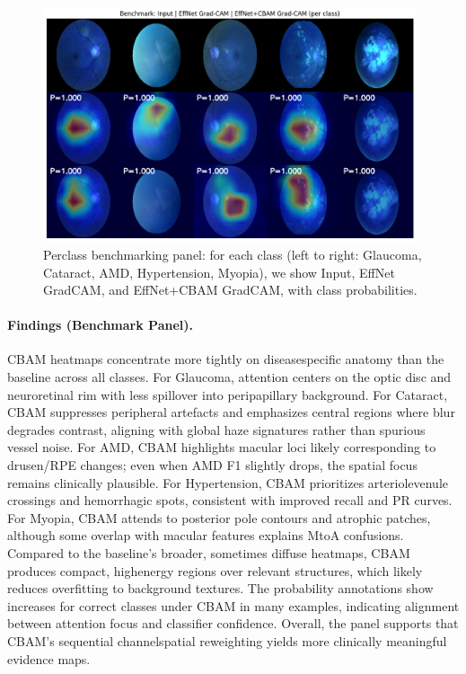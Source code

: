 \begin{figure}[H]
  \centering
  \includegraphics[width=0.98\textwidth]{../new_work/figures/gradcam_benchmark_panel.png}
  \caption{Per\textendash class benchmarking panel: for each class (left to right: Glaucoma, Cataract, AMD, Hypertension, Myopia), we show Input, EffNet Grad\textendash CAM, and EffNet+CBAM Grad\textendash CAM, with class probabilities.}
  \label{fig:gradcam_panel}
\end{figure}

\paragraph{Findings (Benchmark Panel).}
CBAM heatmaps concentrate more tightly on disease\textendash specific anatomy than the baseline across all classes. For Glaucoma, attention centers on the optic disc and neuroretinal rim with less spillover into peripapillary background. For Cataract, CBAM suppresses peripheral artefacts and emphasizes central regions where blur degrades contrast, aligning with global haze signatures rather than spurious vessel noise. For AMD, CBAM highlights macular loci likely corresponding to drusen/RPE changes; even when AMD F1 slightly drops, the spatial focus remains clinically plausible. For Hypertension, CBAM prioritizes arteriole\textendash venule crossings and hemorrhagic spots, consistent with improved recall and PR curves. For Myopia, CBAM attends to posterior pole contours and atrophic patches, although some overlap with macular features explains M\textendash to\textendash A confusions. Compared to the baseline’s broader, sometimes diffuse heatmaps, CBAM produces compact, high\textendash energy regions over relevant structures, which likely reduces overfitting to background textures. The probability annotations show increases for correct classes under CBAM in many examples, indicating alignment between attention focus and classifier confidence. Overall, the panel supports that CBAM’s sequential channel\textendash spatial reweighting yields more clinically meaningful evidence maps.

